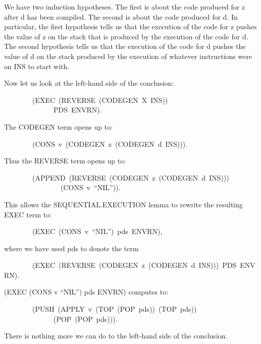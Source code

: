 \documentclass[11pt]{book}
\newenvironment{pubasis}{\begin{flushleft}\ttfamily\small}{\normalsize\rmfamily\end{flushleft}}
\begin{document}
We have two induction hypotheses.
The first is about the code produced for z after d has been
compiled.  The second is about the code produced for d.
In particular, the first hypothesis tells us that the execution of
the code for z   pushes the value of z on the stack that
is produced by the execution of the code for d.  The second hypothesis
tells us that the execution of the code for d   pushes the
value of d on the stack produced by the execution of whatever
instructions were on INS to start with.

Now let us look at the left-hand side of the
conclusion:
\begin{pubasis}
~~~~~~~~(EXEC~(REVERSE~(CODEGEN~X~INS))\\
~~~~~~~~~~~~~~PDS~ENVRN).\\
\end{pubasis}
The CODEGEN term opens up to:
\begin{pubasis}
~~~~~~~~(CONS~v~(CODEGEN~z~(CODEGEN~d~INS))).\\
\end{pubasis}
Thus the REVERSE term opens up to:
\begin{pubasis}
~~~~~~~~(APPEND~(REVERSE~(CODEGEN~z~(CODEGEN~d~INS)))\\
~~~~~~~~~~~~~~~~(CONS~v~``NIL'')).\\
\end{pubasis}
This allows the SEQUENTIAL.EXECUTION lemma to rewrite the resulting EXEC
term to:
\begin{pubasis}
~~~~~~~~(EXEC~(CONS~v~``NIL'')~pds~ENVRN),\\
\end{pubasis}
where we have used pds to denote the term
\begin{pubasis}
~~~~~~~~(EXEC~(REVERSE~(CODEGEN~z~(CODEGEN~d~INS)))~PDS~ENVRN).\\
\end{pubasis}
(EXEC (CONS v ``NIL'') pds ENVRN) computes to:
\begin{pubasis}
~~~~~~~~(PUSH~(APPLY~v~(TOP~(POP~pds))~(TOP~pds))\\
~~~~~~~~~~~~~~(POP~(POP~pds))).\\
\end{pubasis}
There is nothing more we can do to the left-hand side of the conclusion.
\end{document}
